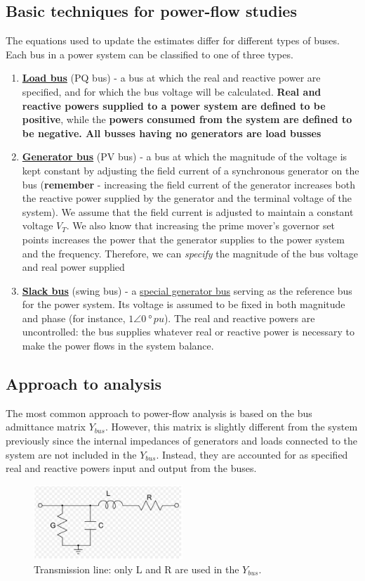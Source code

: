 \subsection{Basic techniques for power-flow studies}
The equations used to update the estimates differ for different types of buses. Each bus in a power system can be classified to one of three types.
\begin{enumerate}
	\item \textbf{\underline{Load bus}} (PQ bus) - a bus at which the real and reactive power are specified, and for which the bus voltage will be calculated. \textbf{Real and reactive powers supplied to a power system are defined to be positive}, while the \textbf{powers consumed from the system are defined to be negative. All busses having no generators are load busses}
	\item \textbf{\underline{Generator bus}} (PV bus) - a bus at which the magnitude of the voltage is kept constant by adjusting the field current of a synchronous generator on the bus (\textbf{remember} - increasing the field current of the generator increases both the reactive power supplied by the generator and the terminal voltage of the system). We assume that the field current is adjusted to maintain a constant voltage $V_T$. We also know that increasing the prime mover's governor set points increases the power that the generator supplies to the power system and the frequency. Therefore, we can \textit{specify} the magnitude of the bus voltage and real power supplied
	\item \textbf{\underline{Slack bus}} (swing bus) - a \underline{special generator bus} serving as the reference bus for the power system. Its voltage is assumed to be fixed in both magnitude and phase (for instance, $1\angle\SI{0}{\degree}\, \si{pu}$). The real and reactive powers are uncontrolled: the bus supplies whatever real or reactive power is necessary to make the power flows in the system balance. 
\end{enumerate}
\subsection{Approach to analysis}
The most common approach to power-flow analysis is based on the bus admittance matrix $Y_{bus}$. However, this matrix is slightly different from the system previously since the internal impedances of generators and loads connected to the system are not included in the $Y_{bus}$. Instead, they are accounted for as specified real and reactive powers input and output from the buses.
\begin{figure}[H]
	\centering
	\includegraphics[width = 0.5\textwidth]{./img/figure49.png}
	\caption{Transmission line: only L and R are used in the $Y_{bus}$.}
\end{figure}
